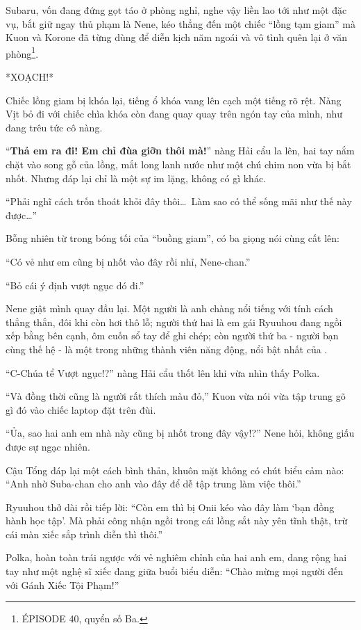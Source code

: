 \documentclass[../main.tex]{subfiles}
\begin{document}
Subaru, vốn đang đứng gọt táo ở phòng nghỉ, nghe vậy liền lao tới như một đặc vụ, bắt giữ ngay thủ phạm là Nene, kéo thẳng đến một chiếc ``lồng tạm giam'' mà Kuon và Korone đã từng dùng để diễn kịch năm ngoái và vô tình quên lại ở văn phòng\footnote{{\flaregothic ÉPISODE 40}, quyển số Ba.}.

*XOẠCH!*

Chiếc lồng giam bị khóa lại, tiếng ổ khóa vang lên cạch một tiếng rõ rệt. Nàng Vịt bỏ đi với chiếc chìa khóa còn đang quay quay trên ngón tay của mình, như đang trêu tức cô nàng.

``\textbf{Thả em ra đi! Em chỉ đùa giỡn thôi mà!}'' nàng Hải cẩu la lên, hai tay nắm chặt vào song gỗ của lồng, mắt long lanh nước như một chú chim non vừa bị bắt nhốt. Nhưng đáp lại chỉ là một sự im lặng, không có gì khác.

``Phải nghĩ cách trốn thoát khỏi đây thôi\dots\ Làm sao có thể sống mãi như thế này được\dots''

Bỗng nhiên từ trong bóng tối của ``buồng giam'', có ba giọng nói cùng cất lên:

``Có vẻ như em cũng bị nhốt vào đây rồi nhỉ, Nene-chan.''

``Bỏ cái ý định vượt ngục đó đi.''

Nene giật mình quay đầu lại. Một người là anh chàng nổi tiếng với tính cách thẳng thắn, đôi khi còn hơi thô lỗ; người thứ hai là em gái Ryuuhou đang ngồi xếp bằng bên cạnh, ôm cuốn sổ tay để ghi chép; còn người thứ ba - người bạn cùng thế hệ - là một trong những thành viên năng động, nổi bật nhất của \hll.

``C-Chúa tể Vượt ngục!?'' nàng Hải cẩu thốt lên khi vừa nhìn thấy Polka.

``Và đồng thời cũng là người rất thích màu đỏ,'' Kuon vừa nói vừa tập trung gõ gì đó vào chiếc laptop đặt trên đùi.

``Ủa, sao hai anh em nhà này cũng bị nhốt trong đây vậy!?'' Nene hỏi, không giấu được sự ngạc nhiên.

Cậu Tổng đáp lại một cách bình thản, khuôn mặt không có chút biểu cảm nào: ``Anh nhờ Suba-chan cho anh vào đây để dễ tập trung làm việc thôi.''

Ryuuhou thở dài rồi tiếp lời: ``Còn em thì bị Onii kéo vào đây làm `bạn đồng hành học tập'. Mà phải công nhận ngồi trong cái lồng sắt này yên tĩnh thật, trừ cái màn xiếc sắp trình diễn thì thôi.''

Polka, hoàn toàn trái ngược với vẻ nghiêm chỉnh của hai anh em, dang rộng hai tay như một nghệ sĩ xiếc đang giữa buổi biểu diễn: ``Chào mừng mọi người đến với Gánh Xiếc Tội Phạm!''
\end{document}
